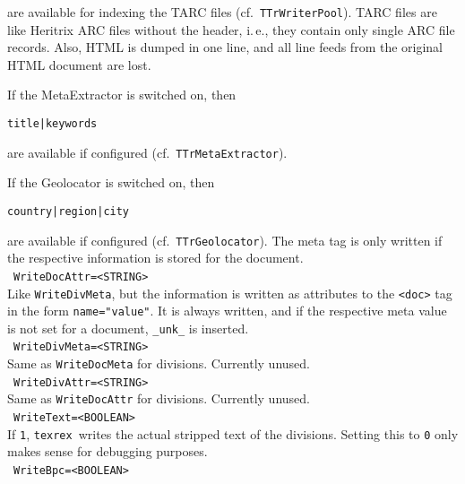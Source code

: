 \documentclass[12pt,a4paper]{article}
\newcommand{\trthis}{\texttt{texrex}}
\begin{document}
are available for indexing the TARC files (cf.\ \texttt{TTrWriterPool}).
TARC files are like Heritrix ARC files without the header, i.\,e., they contain only single ARC file records.
Also, HTML is dumped in one line, and all line feeds from the original HTML document are lost.

If the MetaExtractor is switched on, then

\begin{center}
  \texttt{title|keywords}
\end{center}

are available if configured (cf.\ \texttt{TTrMetaExtractor}).

If the Geolocator is switched on, then

\begin{center}
  \texttt{country|region|city}
\end{center}

are available if configured (cf.\ \texttt{TTrGeolocator}).
The meta tag is only written if the respective information is stored for the document.\\

\noindent\textbullet~\texttt{WriteDocAttr=<STRING>}\\

Like \texttt{WriteDivMeta}, but the information is written as attributes to the \texttt{<doc>} tag in the form \texttt{name="value"}.
It is always written, and if the respective meta value is not set for a document, \texttt{\_unk\_} is inserted.\\

\noindent\textbullet~\texttt{WriteDivMeta=<STRING>}\\

Same as \texttt{WriteDocMeta} for divisions.
Currently unused.\\

\noindent\textbullet~\texttt{WriteDivAttr=<STRING>}\\

Same as \texttt{WriteDocAttr} for divisions.
Currently unused.\\

\noindent\textbullet~\texttt{WriteText=<BOOLEAN>}\\

If \texttt{1}, \trthis\ writes the actual stripped text of the divisions.
Setting this to \texttt{0} only makes sense for debugging purposes.\\

\noindent\textbullet~\texttt{WriteBpc=<BOOLEAN>}\\
\end{document}

